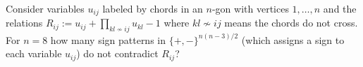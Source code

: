 Consider variables $u_{ij}$ labeled by chords in an $n$-gon with vertices $1,\ldots,n$ and the relations $R_{ij}:= u_{ij} + \prod_{kl \nsim ij} u_{kl} -1$ where $kl \nsim ij$ means the chords do not cross. For $n=8$ how many sign patterns in $\{+,-\}^{n(n-3)/2}$ (which assigns a sign to each variable  $u_{ij}$) do not contradict $R_{ij}$?
